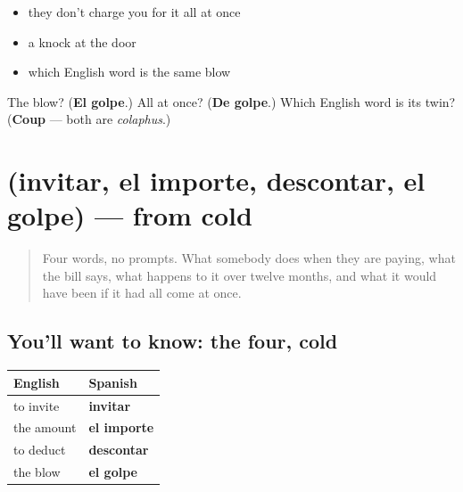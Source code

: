 \begin{itemize}
\raggedright
  \item they don't charge you for it all at once
  \item a knock at the door
  \item which English word is the same blow
\end{itemize}

\begin{tcolorbox}[breakable,colback=teal!4,colframe=teal!35!black,title={Before you move on}]
The blow? (\textbf{El golpe}.) All at once? (\textbf{De golpe}.) Which English word is its twin? (\textbf{Coup} — both are \emph{colaphus}.)
\end{tcolorbox}
\section[(invitar, el importe, descontar, el …]{(invitar, el importe, descontar, el golpe) — from cold}

\label{lesson:ES-R474-repaso-pago}



\begin{quote}
Four words, no prompts. What somebody does when they are paying, what the bill says, what happens to it over twelve months, and what it would have been if it had all come at once.
\end{quote}

\subsection*{You'll want to know: the four, cold}
\noindent
\begin{tabularx}{\linewidth}{@{}>{\raggedright\arraybackslash}X>{\raggedright\arraybackslash}X@{}}
\toprule
\textbf{English} & \textbf{Spanish} \\
\midrule
to invite & \textbf{invitar} \\
the amount & \textbf{el importe} \\
to deduct & \textbf{descontar} \\
the blow & \textbf{el golpe} \\
\bottomrule
\end{tabularx}

